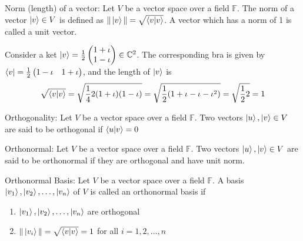 \begin{definition}
    Norm (length) of a vector: Let $V$ be a vector space over a field $\mathbb{F}$. The norm of a vector $\ket{v}\in V$ is defined as $\|\ket{v}\|=\sqrt{\braket{v|v}}$.
    A vector which has a norm of 1 is called a unit vector.
\end{definition}

\begin{example}
    Consider a ket $\ket{v}=\frac{1}{2}\begin{pmatrix} 1+\iota \\ 1-\iota \end{pmatrix} \in \mathbb{C}^2$. The corresponding bra is given by $\bra{v} =\frac{1}{2}\begin{pmatrix} 1-\iota & 1+\iota \end{pmatrix}$, and the length of $\ket{v}$ is
    \[
    \sqrt{\braket{v|v}} =\sqrt{\frac{1}{4}2(1+\iota)(1-\iota)}=\sqrt{\frac{1}{2}(1+\iota -\iota -\iota^2)}=\sqrt{\frac{1}{2}2}=1
    \]
\end{example}

\begin{definition}
    Orthogonality: Let $V$ be a vector space over a field $\mathbb{F}$. Two vectors $\ket{u},\ket{v}\in V$ are said to be orthogonal if $\braket{u|v}=0$
\end{definition}

\begin{definition}
    Orthonormal: Let $V$ be a vector space over a field $\mathbb{F}$. Two vectors $\ket{u},\ket{v}\in V$ are said to be orthonormal if they are orthogonal and have unit norm.
\end{definition}

\begin{definition}
    Orthonormal Basis: Let $V$ be a vector space over a field $\mathbb{F}$. A basis $\ket{v_1},\ket{v_2},\ldots,\ket{v_n}$ of $V$ is called an orthonormal basis if
    \begin{enumerate}
        \item $\ket{v_1},\ket{v_2},\ldots,\ket{v_n}$ are orthogonal
        \item $\|\ket{v_i}\|= \sqrt{\braket{v|v}} = 1$ for all $i=1,2,\ldots,n$
    \end{enumerate}
\end{definition}

